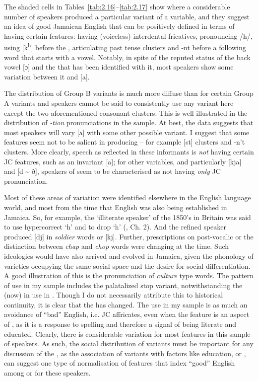 The shaded cells in Tables~\ref{tab:2.16}--\ref{tab:2.17} show where a considerable number of speakers produced a particular variant of a variable, and they suggest an idea of good Jamaican English that can be positively defined in terms of having certain features: having (voiceless) interdental fricatives, pronouncing /h/, using [k\textsuperscript{h}] before the , articulating past tense clusters and -nt before a following word that starts with a vowel.  Notably, in spite of the reputed status of the back vowel [ɔ] and the  that has been identified with it, most speakers show some variation between it and [a].  

  The distribution of Group B variants is much more diffuse than for certain Group A variants and speakers cannot be said to consistently use any variant here except the two aforementioned consonant clusters.  This is well illustrated in the distribution of \textit{-tion} pronunciations in the sample.  At best, the data suggests that most speakers will vary [ʌ] with some other possible variant.  I suggest that some features seem not to be salient in producing  – for example [st] clusters and -n’t clusters.  More clearly,  speech as reflected in these informants is \textit{not} having certain JC features, such as an invariant  [a]; for other variables, and particularly [kja] and [d {\textasciitilde} ð], speakers of  seem to be characterised as not having \textit{only} JC pronunciation.

Most of these areas of variation were identified elsewhere in the English language world, and most from the time that English was also being established in Jamaica.  So, for example, the ‘illiterate speaker’ of the 1850's in Britain was said to use hypercorrect ‘h’ and to drop ‘h’ (\citealt{Mugglestone1995}, Ch. 2).  And the refined speaker produced [dj] in \textit{soldier} words or [kj].  Further, prescriptions on post-vocalic  or the distinction between \textit{chap} and \textit{chop} words were changing at the time.  Such ideologies would have also arrived and evolved in Jamaica, given the phonology of  varieties occupying the same social space and the desire for social differentiation.  A good illustration of this is the pronunciation of \textit{culture} type words.  The pattern of use in my sample includes the palatalized stop variant, notwithstanding the  (now) in use in .  Though I do not necessarily attribute this to historical continuity, it is clear that the  has changed.  The use in my sample is as much an avoidance of “bad” English, i.e. JC affricates, even when the feature is an aspect of , as it is a response to spelling and therefore a signal of being literate and educated.  Clearly, there is considerable variation for most features in this sample of speakers.  As such, the social distribution of variants must be important for any discussion of the , as the association of variants with factors like education, or , can suggest one type of normalisation of features that index “good” English among or for these speakers.  

